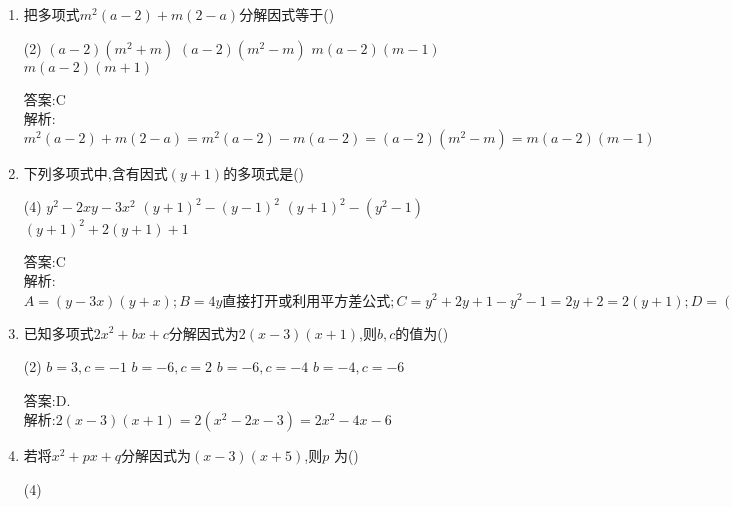 \documentclass[cn,blue]{elegantbook}
\begin{document}
\begin{enumerate}
    \item 把多项式\(m^2 (a - 2) + m(2 - a)\)分解因式等于(\qquad)\\
    \begin{tasks}(2) 
    \task \((a - 2)(m^2 + m)\)
    \task \((a - 2)(m^2 - m)\)
    \task \(m(a - 2)(m -1)\)
    \task \(m(a - 2)(m +1)\)
    \end{tasks}

\begin{solution}
    答案:C\\
    解析:\(m^2 (a - 2) + m(2 - a)=m^2(a-2)-m(a-2)=(a-2)(m^2-m)=m(a-2)(m-1)\)\\
\end{solution}
          
    \item 下列多项式中,含有因式\(( y +1)\)的多项式是(\qquad)\\
    \begin{tasks}(4) 
    \task \(y^2 - 2xy - 3x^2\)
    \task \(( y +1)^2 - ( y -1)^2\)
    \task \(( y +1)^2 - ( y^2 -1)\)
    \task \(( y +1)^2 + 2( y +1) +1\)
    \end{tasks}
\begin{solution}
    答案:C\\
    解析:\(A=(y-3x)(y+x);B=4y\text{直接打开或利用平方差公式};C=y^2+2y+1-y^2-1=2y+2=2(y+1); D=(y+1+1)^2=(y+2)^2\)\\
\end{solution}
          
    \item 已知多项式\(2x^2 + bx + c\)分解因式为\(2(x - 3)(x +1)\),则\(b,c\)的值为(\qquad)\\
    \begin{tasks}(2) 
    \task \(b = 3,c = -1\)
    \task \(b = -6,c = 2\)
    \task \(b = -6,c = -4\)
    \task \(b = -4,c = -6\)
    \end{tasks}
\begin{solution}
    答案:D.\\
    解析:\(2(x - 3)(x +1)=2(x^2-2x-3)=2x^2-4x-6\)\\
\end{solution}
          
    \item 若将\(x^2 + px + q\)分解因式为\((x - 3)(x + 5)\),则\(p\) 为(\qquad)\\
    \begin{tasks}(4) 
    \end{tasks}


\end{enumerate}
\end{document}
